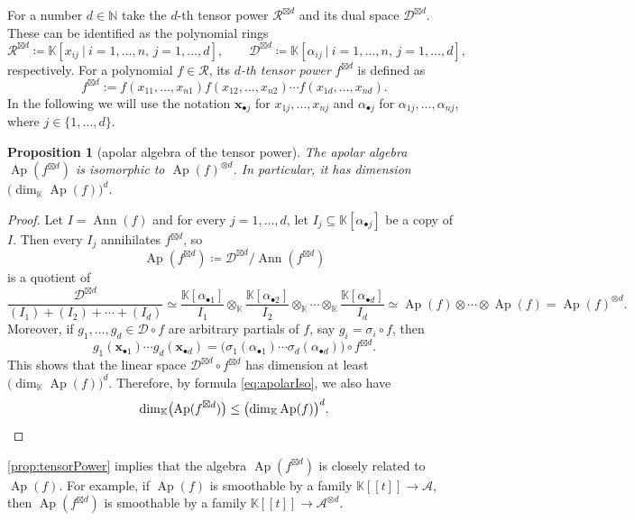 \documentclass[a4paper,11pt,reqno]{amsart}
\newcommand{\bfx}{\mathbf{x}}
\newcommand{\calA}{\mathcal{A}}
\newcommand{\calD}{\mathcal{D}}
\newcommand{\calR}{\mathcal{R}}
\newcommand{\bbK}{\mathbb{K}}
\newcommand{\bbN}{\mathbb{N}}
\DeclareMathOperator{\Ann}{Ann}
\DeclareMathOperator{\Ap}{Ap}
\numberwithin{equation}{section}
\theoremstyle{definition}
\theoremstyle{plain}
\newtheorem{prop}[defn]{Proposition}
\theoremstyle{remark}
\begin{document}
For {a number} $d\in\bbN$ take the $d$-th tensor power
$\calR^{\boxtimes d}$ and its dual space $\calD^{\boxtimes d}$. These can be
identified as the polynomial rings
\[
\calR^{\boxtimes d}\coloneq\bbK[x_{ij}\ |\ i=1,\dots,n,\,j=1,\dots,d],\qquad
\calD^{\boxtimes d}\coloneq\bbK[\alpha_{ij}\ |\ i=1,\dots,n,\,j=1,\dots,d],
\]
{respectively.}
For a polynomial $f\in \calR$, its \emph{$d$-th tensor power} $f^{\boxtimes d}$ is defined as
\[
    f^{\boxtimes d} := f(x_{11}, \ldots ,x_{n1})f(x_{12}, \ldots ,
    x_{n2})\cdots f\left( x_{1d}, \ldots ,x_{nd} \right).
\]
In the following we will use the notation $\bfx_{\bullet j}$ for $x_{1j}, \ldots,x_{nj}$ and $\alpha_{\bullet j}$ for $\alpha_{1j}, \ldots ,\alpha_{nj}$,
where $j\in \{1, \ldots ,d\}$.
\begin{prop}[apolar algebra of the tensor power]\label{prop:tensorPower}
    The apolar algebra $\Ap(f^{\boxtimes d})$ is isomorphic to
    $\Ap(f)^{\otimes d}$. In particular, it has dimension $\bigl(\dim_{\bbK} \Ap(f)\bigr)^d$.
\end{prop}
\begin{proof}
    Let $I = \Ann(f)$ and for every $j=1, \ldots ,d$, let $I_j \subseteq
    \bbK[\alpha_{\bullet j}]$ be a copy of $I$. Then every $I_j$
    annihilates $f^{\boxtimes d}$, so \[ \Ap(f^{\boxtimes d}) \coloneq \calD^{\boxtimes
    d}/\Ann(f^{\boxtimes d})\] is a quotient of
    \[
        \frac{\calD^{\boxtimes d}}{(I_1) + (I_2) + \cdots + (I_d)} \simeq
        \frac{\bbK[\alpha_{\bullet 1}]}{I_1}\otimes_{\bbK}
        \frac{\bbK[\alpha_{\bullet 2}]}{I_2}\otimes_{\bbK}
         \cdots \otimes_{\bbK}
        \frac{\bbK[\alpha_{\bullet d}]}{I_d} \simeq \Ap(f)\otimes \cdots \otimes \Ap(f) = \Ap(f)^{\otimes d}.
     \]
Moreover, if $g_1, \ldots ,g_d\in \calD\circ f$ are arbitrary partials of $f$, say
$g_i = \sigma_i\circ f$, then
\[
    g_1(\bfx_{\bullet 1})\cdots g_{d}(\bfx_{\bullet d}) =
    \bigl(\sigma_{1}(\alpha_{\bullet 1})\cdots
    \sigma_{d}(\alpha_{\bullet d})\bigr)\circ f^{\boxtimes d}.
\]
This shows that the linear space $\calD^{\boxtimes d}\circ f^{\boxtimes d}$ has
dimension at least $\bigl(\dim_{\bbK} \Ap(f)\bigr)^d$. Therefore, by formula
\eqref{eq:apolarIso}, we also have
\[
    \dim_{\bbK}\bigl(\Ap(f^{\boxtimes d})\bigr)\leq\bigl(\dim_{\bbK} \Ap(f)\bigr)^d.\qedhere
\]
\end{proof}
\autoref{prop:tensorPower} implies that the algebra
$\Ap(f^{\boxtimes d})$ is closely related to $\Ap(f)$. For example, if
$\Ap(f)$ is smoothable by a family $\bbK[\![t]\!]\to \calA$, then
$\Ap(f^{\boxtimes d})$ is smoothable by a family $\bbK[\![t]\!]\to
\calA^{\otimes d}$.
\end{document}
